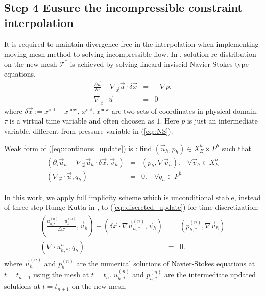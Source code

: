 \documentclass[a4paper, 11pt]{article}
\begin{document}
   \subsection{Step 4 Eusure the incompressible constraint
     interpolation}
      It is required to maintain divergence-free in the interpolation
      when implementing moving mesh method to solving incompressible
      flow. In \cite{di2005moving}, solution re-distribution on the new 
      mesh $\mathcal{T}^*$ is achieved by solving lineard inviscid 
      Navier-Stokes-type equations.
      \begin{eqnarray}
        \frac{\partial \vec{u}}{\partial \tau} - \nabla_{\vec{x}}\vec{u}
        \cdot \delta \vec{x} & = & - \nabla p. \\
        \nabla_{\vec{x}}\cdot \vec{u} & = & 0
        \label{eq::continous_update}
      \end{eqnarray} 
      where $\delta \vec{x} := x^{\text{old}} - x^{\text{new}}$,
      $x^{\text{old}}, x^{\text{new}}$ are two sets of coordinates in
      physical domain. $\tau$ is a virtual time variable and often
      choosen as $1$. Here $p$ is just an intermediate variable,
      different from pressure variable in (\ref{eq::NS}). 

      Weak form of (\ref{eq::continous_update}) is : find $(\vec{u}_h,
      p_h) \in X_E^h \times P^h$ such that 
      \begin{eqnarray}
        \begin{aligned}
          \left( \partial_{\tau} \vec{u}_h - \nabla_{\vec{x}}\vec{u}_h
            \cdot \delta \vec{x}, \vec{v}_h \right) & = & \left( p_h, \nabla
            \vec{v}_h \right). \quad \forall \vec{v}_h \in X_E^h \\
          \left( \nabla_{\vec{x}} \cdot \vec{u}, q_h\right) & = & 0. \quad \forall
          q_h \in P^h
        \end{aligned}
        \label{eq::discreted_update}
      \end{eqnarray}
      
      In this work, we apply full implicity scheme which is
      unconditional stable, instead of
      three-step Runge-Kutta in \cite{di2005moving}, to
      (\ref{eq::discreted_update}) for time discretization:
      \begin{eqnarray}
        \begin{aligned}
          \left ( \frac{u_{h, *}^{(n)} - u_h^{(n)}}{\triangle \tau},
            \vec{v}_h \right) + \left( \delta \vec{x} \cdot \nabla 
            \vec{u}_{h, *}^{(n)}, \vec{v}_h \right)  & = & \left( 
            p_{h, *}^{(n)}, \nabla \vec{v}_h \right) \\
          \left( \nabla \cdot u_{h, *}^{n}, q_h \right) & = & 0.
        \end{aligned}
      \end{eqnarray}
      where $\vec{u}_h^{(n)}$ and $p_h^{(n)}$ are the numerical solutions of
      Navier-Stokes equations at $t = t_{n + 1}$ using the mesh at $t
      = t_n$. $u_{h,*}^{(n)}$ and $p_{h, *}^{(n)}$ are the intermediate
      updated solutions at $t =t_{n + 1}$ on the new mesh. 
   
\end{document}
